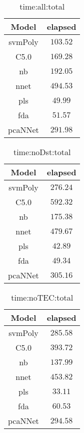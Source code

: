 \begin{table}[!ht]
	\centering
	\begin{tabular}{|c|c|}
		\hline
		Model & elapsed \\ \hline
		svmPoly & $103.52$ \\ \hline
		C5.0 & $169.28$ \\ \hline
		nb & $192.05$ \\ \hline
		nnet & $494.53$ \\ \hline
		pls & $49.99$ \\ \hline
		fda & $51.57$ \\ \hline
		pcaNNet & $291.98$ \\ \hline
	\end{tabular}
	\caption{time:all:total}
	\label{tab:time:all:total}
\end{table}

\begin{table}[!ht]
	\centering
	\begin{tabular}{|c|c|}
		\hline
		Model & elapsed \\ \hline
		svmPoly & $276.24$ \\ \hline
		C5.0 & $592.32$ \\ \hline
		nb & $175.38$ \\ \hline
		nnet & $479.67$ \\ \hline
		pls & $42.89$ \\ \hline
		fda & $49.34$ \\ \hline
		pcaNNet & $305.16$ \\ \hline
	\end{tabular}
	\caption{time:noDst:total}
	\label{tab:time:noDst:total}
\end{table}

\begin{table}[!ht]
	\centering
	\begin{tabular}{|c|c|}
		\hline
		Model & elapsed \\ \hline
		svmPoly & $285.58$ \\ \hline
		C5.0 & $393.72$ \\ \hline
		nb & $137.99$ \\ \hline
		nnet & $453.82$ \\ \hline
		pls & $33.11$ \\ \hline
		fda & $60.53$ \\ \hline
		pcaNNet & $294.58$ \\ \hline
	\end{tabular}
	\caption{time:noTEC:total}
	\label{tab:time:noTEC:total}
\end{table}

